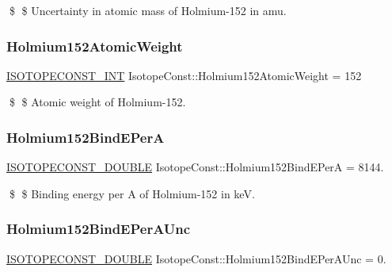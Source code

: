 \$ \$ Uncertainty in atomic mass of Holmium-\/152 in amu. \mbox{\label{group___isotope_const-_holmium-_ho152_ga743d6f024f8cf1c5fd4f72f20e50a7f6}} 
\subsubsection{\texorpdfstring{Holmium152\+Atomic\+Weight}{Holmium152AtomicWeight}}
{\footnotesize\ttfamily \mbox{\hyperlink{group___isotope_const-_macros_ga5f18360b3e99483a35c32d789e62621c}{I\+S\+O\+T\+O\+P\+E\+C\+O\+N\+S\+T\+\_\+\+I\+NT}} Isotope\+Const\+::\+Holmium152\+Atomic\+Weight = 152}

\$ \$ Atomic weight of Holmium-\/152. \mbox{\label{group___isotope_const-_holmium-_ho152_ga4452bac9813f9b0355bebd8e5830be1d}} 
\subsubsection{\texorpdfstring{Holmium152\+Bind\+E\+PerA}{Holmium152BindEPerA}}
{\footnotesize\ttfamily \mbox{\hyperlink{group___isotope_const-_macros_ga8f45a7272ce02c0b4c65c44636ed719a}{I\+S\+O\+T\+O\+P\+E\+C\+O\+N\+S\+T\+\_\+\+D\+O\+U\+B\+LE}} Isotope\+Const\+::\+Holmium152\+Bind\+E\+PerA = 8144.}

\$ \$ Binding energy per A of Holmium-\/152 in keV. \mbox{\label{group___isotope_const-_holmium-_ho152_ga7ac396b23767cf108c7b9350d0a48dcc}} 
\subsubsection{\texorpdfstring{Holmium152\+Bind\+E\+Per\+A\+Unc}{Holmium152BindEPerAUnc}}
{\footnotesize\ttfamily \mbox{\hyperlink{group___isotope_const-_macros_ga8f45a7272ce02c0b4c65c44636ed719a}{I\+S\+O\+T\+O\+P\+E\+C\+O\+N\+S\+T\+\_\+\+D\+O\+U\+B\+LE}} Isotope\+Const\+::\+Holmium152\+Bind\+E\+Per\+A\+Unc = 0.}

